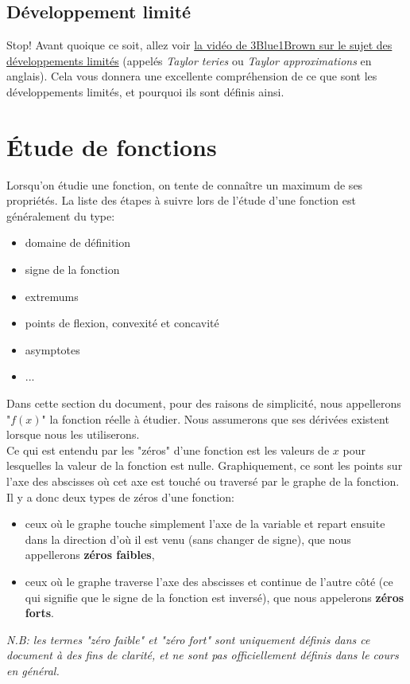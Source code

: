 \documentclass{article}
\numberwithin{equation}{subsection}
\begin{document}
\subsection{Développement limité}
Stop! Avant quoique ce soit, allez voir \href{https://www.youtube.com/watch?v=3d6DsjIBzJ4}{la vidéo de 3Blue1Brown sur le sujet des développements limités} (appelés \emph{Taylor teries} ou \emph{Taylor approximations} en anglais). Cela vous donnera une excellente compréhension de ce que sont les développements limités, et pourquoi ils sont définis ainsi. %

\section{Étude de fonctions}
Lorsqu'on étudie une fonction, on tente de connaître un maximum de ses propriétés. La liste des étapes à suivre lors de l'étude d'une fonction est généralement du type:
\begin{itemize}
	\item domaine de définition
	\item signe de la fonction
	\item extremums
	\item points de flexion, convexité et concavité
	\item asymptotes
	\item ... %
\end{itemize}

Dans cette section du document, pour des raisons de simplicité, nous appellerons "\(f(x)\)" la fonction réelle à étudier. Nous assumerons que ses dérivées existent lorsque nous les utiliserons. \\
Ce qui est entendu par les "zéros" d'une fonction est les valeurs de \(x\) pour lesquelles la valeur de la fonction est nulle. Graphiquement, ce sont les points sur l'axe des abscisses où cet axe est touché ou traversé par le graphe de la fonction. \\
Il y a donc deux types de zéros d'une fonction: 
\begin{itemize}
	\item ceux où le graphe touche simplement l'axe de la variable et repart ensuite dans la direction d'où il est venu (sans changer de signe), que nous appellerons \textbf{zéros faibles}, %
	\item ceux où le graphe traverse l'axe des abscisses et continue de l'autre côté (ce qui signifie que le signe de la fonction est inversé), que nous appelerons \textbf{zéros forts}.
\end{itemize}
\emph{N.B: les termes "zéro faible" et "zéro fort" sont uniquement définis dans ce document à des fins de clarité, et ne sont pas officiellement définis dans le cours en général.}
\end{document}
